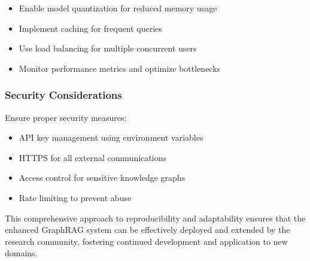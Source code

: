 \begin{itemize}
    \item Enable model quantization for reduced memory usage
    \item Implement caching for frequent queries
    \item Use load balancing for multiple concurrent users
    \item Monitor performance metrics and optimize bottlenecks
\end{itemize}

\subsubsection{Security Considerations}
Ensure proper security measures:

\begin{itemize}
    \item API key management using environment variables
    \item HTTPS for all external communications
    \item Access control for sensitive knowledge graphs
    \item Rate limiting to prevent abuse
\end{itemize}

This comprehensive approach to reproducibility and adaptability ensures that the enhanced GraphRAG system can be effectively deployed and extended by the research community, fostering continued development and application to new domains.